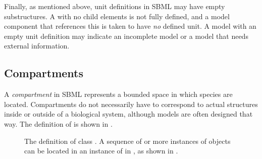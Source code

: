 \begin{blockChanged}

Finally, as mentioned above, unit definitions in SBML \thisLV may have empty \ListOfUnits substructures.  A \UnitDefinition with no child \Unit elements is not fully defined, and a model component that references this \UnitDefinition is taken to have \emph{no} defined unit.  A model with an empty unit definition may indicate an incomplete model or a model that needs external information.

\end{blockChanged}


\subsection{Compartments}
\label{sec:compartments}

A \emph{compartment} in SBML represents a bounded space in which
species are located.  Compartments do not necessarily have to
correspond to actual structures inside or outside of a biological
system, although models are often designed that way.  The definition
of \Compartment is shown in .

\begin{figure}[htb]
  \centering
  \small
  \caption{The definition of class \Compartment.  A
      sequence of  or more instances of \Compartment objects
      can be located in an instance of \ListOfCompartments in
      \Model, as shown in \protect{}.}
  \label{fig:compartment}
\end{figure}

